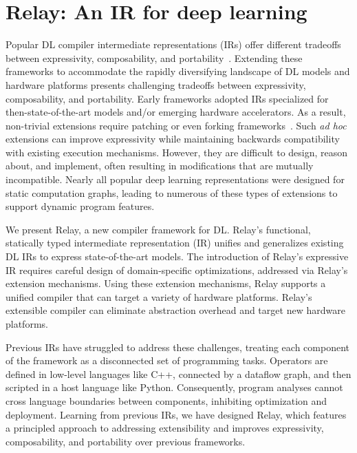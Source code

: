 \chapter{Relay: An IR for deep learning}
\label{ch:relay}

Popular DL compiler intermediate representations (IRs) offer different tradeoffs
between expressivity, composability, and portability~\citep{
  tensorflow, pytorch_ad, chainer_learningsys2015, tangent, theano, glow}.
Extending these frameworks to accommodate
  the rapidly diversifying landscape of
  DL models and hardware platforms presents
  challenging tradeoffs between
  expressivity, composability, and portability.
Early frameworks adopted IRs
  specialized for then-state-of-the-art models and/or
  emerging hardware accelerators.
As a result, non-trivial extensions require
  patching or even forking frameworks~\citep{
    tf_fold, tf_lite, tangent, tf_eager, xla, glow, torchscript}.
Such \textit{ad hoc} extensions can improve expressivity
  while maintaining backwards compatibility with existing execution mechanisms.
However, they are difficult to design, reason about, and implement,
  often resulting in modifications that are mutually incompatible.
Nearly all popular deep learning representations were designed for
  static computation graphs, leading to numerous of these types of
  extensions to support dynamic program features.

We present Relay,
  a new compiler framework for DL.
Relay's functional, statically typed intermediate representation (IR)
  unifies and generalizes existing DL IRs
  to express state-of-the-art models.
The introduction of Relay's expressive IR requires
  careful design of domain-specific optimizations,
  addressed via Relay's extension mechanisms.
Using these extension mechanisms,
  Relay supports a unified compiler that
  can target a variety of hardware platforms.
Relay's extensible compiler
   can eliminate abstraction overhead and
   target new hardware platforms.

Previous IRs have struggled to address these challenges, treating each
  component of the framework as a disconnected set of programming tasks.
Operators are defined in low-level languages like C++,
  connected by a dataflow graph, and then scripted
  in a host language like Python.
Consequently,
  program analyses cannot cross language boundaries between components,
  inhibiting optimization and deployment.
Learning from previous IRs, we have designed Relay,
  which features a principled approach to addressing extensibility
  and improves expressivity, composability, and portability
  over previous frameworks.

